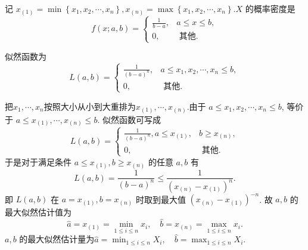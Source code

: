 \begin{solution}
    记 $x_{(1)}=\min \left\{x_1, x_2, \cdots, x_n\right\}, x_{(n)}=\max \left\{x_1, x_2, \cdots, x_n\right\} . X$ 的概率密度是
$$
f(x ; a, b)= \begin{cases}\frac{1}{b-a}, & a \leq x \leq b, \\ 0, & \text { 其他. }\end{cases}
$$

似然函数为
$$
L(a, b)= \begin{cases}\frac{1}{(b-a)^n}, & a \leq x_1, x_2, \cdots, x_n \leq b, \\ 0, & \text { 其他. }\end{cases}
$$

把$x_1, \cdots, x_n$按照大小从小到大重排为$x_{(1)}, \cdots, x_{(n)}$.由于 $a \leq x_1, x_2, \cdots, x_n \leq b$, 等价于 $a \leq x_{(1)},\cdots, x_{(n)} \leq b$. 似然函数可写成
    $$
    L(a, b)= \begin{cases}\frac{1}{(b-a)^n}, a \leq x_{(1)}, & b \geq x_{(n)}, \\ 0, & \text { 其他. }\end{cases}
    $$
    于是对于满足条件 $a \leq x_{(1)}, b \geq x_{(n)}$ 的任意 $a, b$ 有
    $$
    L(a, b)=\frac{1}{(b-a)^n} \leq \frac{1}{\left(x_{(n)}-x_{(1)}\right)^n} .
    $$
    即 $L(a, b)$ 在 $a=x_{(1)}, b=x_{(n)}$ 时取到最大值 $\left(x_{(n)}-x_{(1)}\right)^{-n}$. 故 $a, b$ 的最大似然估计值为
    $$
    \hat{a}=x_{(1)}=\min _{1 \leq i \leq n} x_i, \quad \hat{b}=x_{(n)}=\max _{1 \leq i \leq n} x_i .
    $$
    $a, b$ 的最大似然估计量为$\hat{a}=\min _{1 \leq i \leq n} X_i, \quad \hat{b}=\max _{1 \leq i \leq n} X_i .$


\end{solution}
